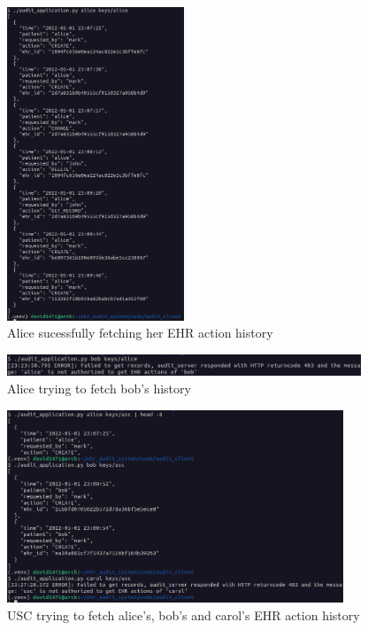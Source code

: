 \documentclass[11pt]{article}
\begin{document}
\begin{flushleft}
\begin{figure}[h!]
\begin{center}
	\includegraphics[width = 200px]{images/alice_history.png}
	\caption{Alice sucessfully fetching her EHR action history}
\end{center}
\end{figure}

\begin{figure}[h!]
\begin{center}
	\includegraphics[width = 400px]{images/alice_fetch_error.png}
	\caption{Alice trying to fetch bob's history}
\end{center}
\end{figure}

\begin{figure}[h!]
\begin{center}
	\includegraphics[width = 380px]{images/usc_fetch_requests.png}
	\caption{USC trying to fetch alice's, bob's and carol's EHR action history}
\end{center}
\end{figure}


\end{flushleft}
\end{document}
